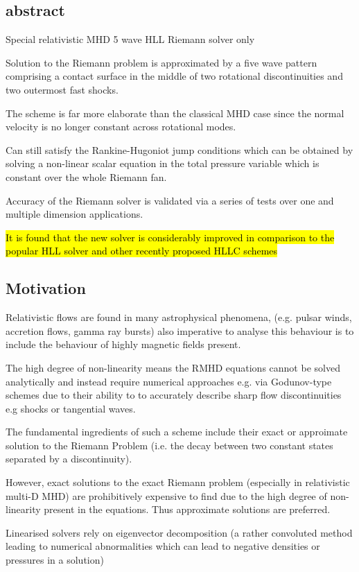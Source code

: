 \documentclass{article}
\begin{document}
 \subsection{abstract}

Special relativistic MHD 5 wave HLL Riemann solver only

Solution to the Riemann problem is approximated by a five wave pattern comprising a contact surface in the middle of two rotational discontinuities and two outermost fast shocks. 

The scheme is far more elaborate than the classical MHD case since the normal velocity is no longer constant across rotational modes. 

Can still satisfy the Rankine-Hugoniot jump conditions which can be obtained by solving a non-linear scalar equation in the total pressure variable which is constant over the whole Riemann fan.

Accuracy of the Riemann solver is validated via a series of tests over one and multiple dimension applications. 

\hl{It is found that the new solver is considerably improved in comparison to the popular HLL solver and other recently proposed HLLC schemes}

\subsection{Motivation}

Relativistic flows are found in many astrophysical phenomena, (e.g. pulsar winds, accretion flows, gamma ray bursts) also imperative to analyse this behaviour is to include the behaviour of highly magnetic fields present. 

The high degree of non-linearity means the RMHD equations cannot be solved analytically and instead require numerical approaches e.g. via Godunov-type schemes due to their ability to to accurately describe sharp flow discontinuities e.g shocks or tangential waves. 

The fundamental ingredients of such a scheme include their exact or approimate solution to the Riemann Problem (i.e. the decay between two constant states separated by a discontinuity).

However, exact solutions to the exact Riemann problem (especially in relativistic multi-D MHD) are prohibitively expensive to find due to the high degree of non-linearity present in the equations. Thus approximate solutions are preferred. 

Linearised solvers rely on eigenvector decomposition (a rather convoluted method leading to numerical abnormalities which can lead to negative densities or pressures in a solution)
\end{document}
